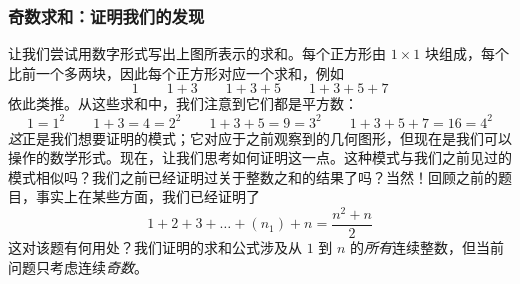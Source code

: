 \subsubsection*{奇数求和：证明我们的发现}

让我们尝试用数字形式写出上图所表示的求和。每个正方形由 $1 \times 1$ 块组成，每个比前一个多两块，因此每个正方形对应一个求和，例如
\[1 \qquad 1+3 \qquad 1+3+5 \qquad 1+3+5+7 \]
依此类推。从这些求和中，我们注意到它们都是平方数：
\[1=1^2 \qquad 1+3=4=2^2 \qquad 1+3+5=9=3^2 \qquad 1+3+5+7=16=4^2 \]
\emph{这}正是我们想要证明的模式；它对应于之前观察到的几何图形，但现在是我们可以操作的数学形式。现在，让我们思考如何证明这一点。这种模式与我们之前见过的模式相似吗？我们之前已经证明过关于整数之和的结果了吗？当然！回顾之前的题目，事实上在某些方面，我们已经证明了
\[1 + 2 + 3 + \dots + (n_1) + n =\frac{n^2 + n}{2}\]
这对该题有何用处？我们证明的求和公式涉及从 $1$ 到 $n$ 的\emph{所有}连续整数，但当前问题只考虑连续\emph{奇数}。

